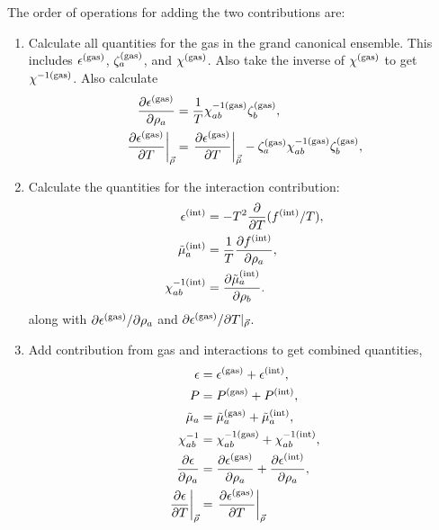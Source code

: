 \documentclass[12pt]{article}
\numberwithin{equation}{section}
\numberwithin{figure}{section}
\begin{document}
The order of operations for adding the two contributions are:
\begin{enumerate}\itemsep=0pt
        \item Calculate all quantities for the gas in the grand canonical ensemble. This includes $\epsilon^{\rm(gas)}$, $\zeta_a^{\rm(gas)}$, and $\chi^{\rm(gas)}$. Also take the inverse of $\chi^{\rm(gas)}$ to get $\chi^{-1{\rm(gas)}}$. Also calculate
        \begin{align*}
        \frac{\partial\epsilon^{\rm(gas)}}{\partial\rho_a}&=\frac{1}{T}\chi^{-1{\rm(gas)}}_{ab}\zeta^{\rm(gas)}_b,\\
        \left.\frac{\partial\epsilon^{\rm(gas)}}{\partial T}\right|_{\vec{\rho}}&=\left.\frac{\partial\epsilon^{\rm(gas)}}{\partial T}\right|_{\vec{\tilde{\mu}}}-\zeta^{\rm(gas)}_a\chi^{-1{\rm(gas)}}_{ab}\zeta^{\rm(gas)}_b,\\
        \end{align*}
        \item Calculate the quantities for the interaction contribution: 
        \begin{align*}
        \epsilon^{\rm(int)}&=-T^2\frac{\partial}{\partial T}(f^{\rm(int)}/T),\\
        \tilde{\mu}_a^{\rm(int)}&=\frac{1}{T}\frac{\partial f^{\rm(int)}}{\partial\rho_a},\\
        \chi^{-1{\rm(int)}}_{ab}&=\frac{\partial\tilde{\mu}^{\rm(int)}_a}{\partial\rho_b}.
        \end{align*}
        along with $\partial\epsilon^{\rm(gas)}/\partial\rho_a$ and $\partial\epsilon^{\rm(gas)}/\partial T|_{\vec{\rho}}$.
        \item Add contribution from gas and interactions to  get combined quantities,
        \begin{align*}
        \epsilon&=\epsilon^{\rm(gas)}+\epsilon^{\rm(int)},\\
        P&=P^{\rm(gas)}+P^{\rm(int)},\\
        \tilde{\mu}_a&=\tilde{\mu}_a^{\rm(gas)}+\tilde{\mu}_a^{\rm(int)},\\
        \chi^{-1}_{ab}&=\chi^{-1{\rm(gas)}}_{ab}+\chi^{-1{\rm(int)}}_{ab},\\
        \frac{\partial\epsilon}{\partial\rho_a}&=\frac{\partial\epsilon^{\rm(gas)}}{\partial\rho_a}+\frac{\partial\epsilon^{\rm(int)}}{\partial\rho_a},\\
        \left.\frac{\partial\epsilon}{\partial T}\right|_{\vec{\rho}}&=\left.\frac{\partial\epsilon^{\rm(gas)}}{\partial T}\right|_{\vec{\rho}}

\end{align*}
\end{enumerate}
\end{document}

